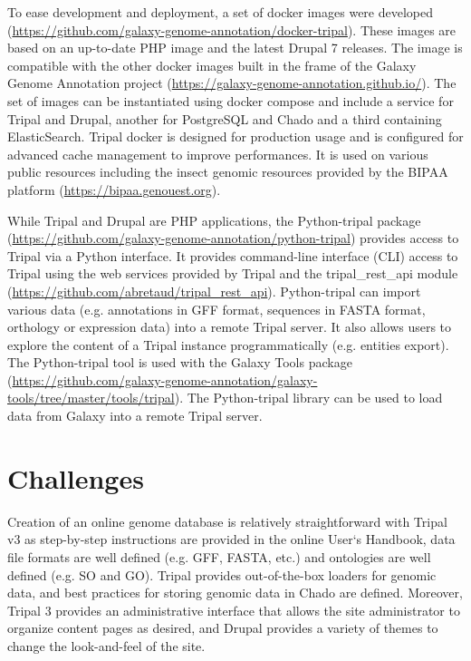 To ease development and deployment, a set of docker images were developed (\url{https://github.com/galaxy-genome-annotation/docker-tripal}). These images are based on an up-to-date PHP image and the latest Drupal 7 releases. The image is compatible with the other docker images built in the frame of the Galaxy Genome Annotation project (\url{https://galaxy-genome-annotation.github.io/}). The set of images can be instantiated using docker compose and include a service for Tripal and Drupal, another for PostgreSQL and Chado and a third containing ElasticSearch. Tripal docker is designed for production usage and is configured for advanced cache management to improve performances. It is used on various public resources including the insect genomic resources provided by the BIPAA platform (\url{https://bipaa.genouest.org}).

While Tripal and Drupal are PHP applications, the Python-tripal package (\url{https://github.com/galaxy-genome-annotation/python-tripal}) provides access to Tripal via a Python interface. It provides command-line interface (CLI) access to Tripal using the web services provided by Tripal and the tripal\_rest\_api module (\url{https://github.com/abretaud/tripal_rest_api}). Python-tripal can import various data (e.g. annotations in GFF format, sequences in FASTA format, orthology or expression data) into a remote Tripal server. It also allows users to explore the content of a Tripal instance programmatically (e.g. entities export). The Python-tripal tool is used with the Galaxy Tools package (\url{https://github.com/galaxy-genome-annotation/galaxy-tools/tree/master/tools/tripal}). The Python-tripal library can be used to load data from Galaxy into a remote Tripal server.


\section*{Challenges}

Creation of an online genome database is relatively straightforward with Tripal v3 as step-by-step instructions are provided in the online User`s Handbook, data file formats are well defined (e.g. GFF, FASTA, etc.) and ontologies are well defined (e.g. SO and GO). Tripal provides out-of-the-box loaders for genomic data, and best practices for storing genomic data in Chado are defined. Moreover, Tripal 3 provides an administrative interface that allows the site administrator to organize content pages as desired, and Drupal provides a variety of themes to change the look-and-feel of the site.

